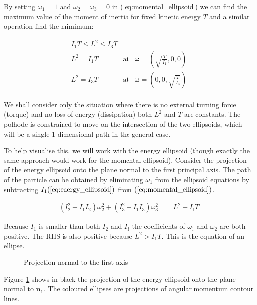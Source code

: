 \documentclass[a4paper, 12pt]{article}
\begin{document}
By setting $\omega_1=1$ and $\omega_2=\omega_3=0$ in (\ref{eq:momental_ellipsoid}) we can find the maximum value of the moment of inertia for fixed kinetic energy $T$ and a similar operation find the mimimum:

\begin{eqnarray*}
  I_1T \leq L^2 \leq I_3 T \\
  L^2=I_1T & \textrm{at} & \mathbf{\omega}=(\sqrt{\frac{T}{I_1}}, 0, 0) \\
  L^2=I_3T & \textrm{at} & \mathbf{\omega}=(0, 0, \sqrt{\frac{T}{I_3}}) \\
\end{eqnarray*}

We shall consider only the situation where there is no external turning force (torque) and no loss of energy (dissipation) both $L^2$ and $T$ are constants. The polhode is constrained to move on the intersection of the two ellipsoids, which will be a single 1-dimensional path in the general case.

To help visualise this, we will work with the energy ellipsoid (though exactly the same approach would work for the momental ellipsoid). Consider the projection of the energy ellipsoid onto the plane normal to the first principal axis. The path of the particle can be obtained by eliminating $\omega_1$ from the ellipsoid equations by subtracting $I_1(\ref{eq:energy_ellipsoid})$ from $(\ref{eq:momental_ellipsoid})$.

\begin{align}
  (I_2^2 - I_1I_2)\omega_2^2 + (I_3^2-I_1I_3)\omega_3^2 & = L^2 - I_1T\label{eq:momell23}
\end{align}

Because $I_1$ is smaller than both $I_2$ and $I_3$ the coefficients of $\omega_1$ and $\omega_2$ are both positive. The RHS is also positive because $L^2 > I_1T$. This is the equation of an ellipse.

\begin{figure}[H]
  
  \begin{center}
    \begin{tikzpicture}%
      
    \end{tikzpicture}
  \end{center}
  \caption{Projection normal to the first axis}
  \label{fig:proj1}
\end{figure}

Figure \ref{fig:proj1} shows in black the projection of the energy ellipsoid onto the plane normal to $\bm{n_1}$. The coloured ellipses are projections of angular momentum contour lines. 
\end{document}
